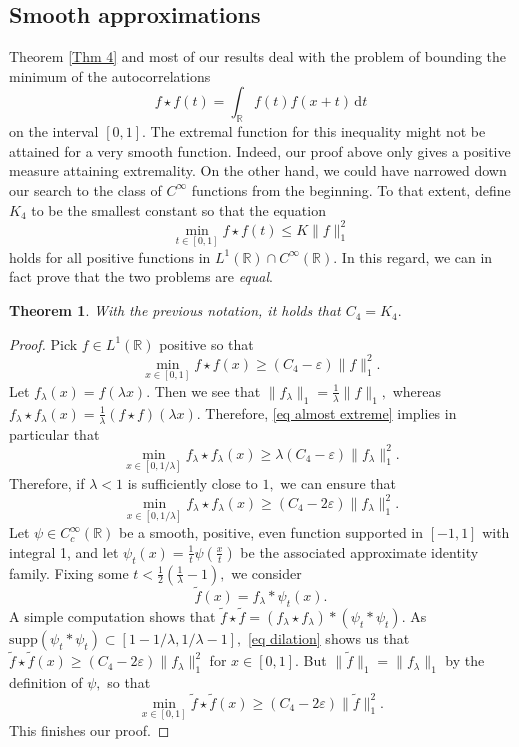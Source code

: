 \documentclass[11pt, reqno]{amsart}
\newcommand{\mmd}{ \mathrm{d}}
\newcommand{\s}{\star}
\numberwithin{equation}{section}
\newtheorem{theorem}{Theorem}[section]
\newcommand{\R}{{\mathbb R}}
\newcommand{\eps}{{\varepsilon}}
\begin{document}
\subsection{Smooth approximations} Theorem \ref{Thm 4} and most of our results deal with the problem of bounding the minimum of the autocorrelations 
\[
f \s f(t) = \int_{\R} f(t) f(x+t) \, \mmd t 
\]
on the interval $[0,1].$ The extremal function for this inequality might not be attained for a very smooth function. Indeed, our proof above only gives a positive measure attaining
extremality. On the other hand, we could have narrowed down our search to the class of $C^{\infty}$ functions from the beginning. 
To that extent, define $K_4$ to be the smallest constant so that the equation  
\begin{equation}\label{eq conv constant} 
\min_{t \in [0,1]} f\s f(t) \le K \|f\|_1^2
\end{equation}
holds for all positive functions in $L^1(\R) \cap C^{\infty}(\R).$ In this regard, we can in fact prove that the two problems are \emph{equal}.

\begin{theorem}\label{Thm last} With the previous notation, it holds that $C_4 = K_4.$
\end{theorem}

\begin{proof} Pick $f \in L^1(\R)$ positive so that 
\begin{equation}\label{eq almost extreme}
\min_{x \in [0,1]} f \s f(x) \ge (C_4 -\eps) \|f\|_1^2.
\end{equation}
Let $f_{\lambda}(x) = f(\lambda x).$ Then we see that $\|f_{\lambda}\|_1 = \frac{1}{\lambda}\|f\|_1,$ whereas 
$f_{\lambda} \s f_{\lambda} (x) = \frac{1}{\lambda} (f\s f)(\lambda x).$ Therefore, \eqref{eq almost extreme} implies in particular that 
\[
\min_{x \in [0,1/\lambda]} f_{\lambda} \s f_{\lambda} (x) \ge \lambda (C_4 - \eps) \|f_{\lambda}\|_1^2.
\]
Therefore, if $\lambda < 1$ is sufficiently close to $1,$ we can ensure that 
\begin{equation}\label{eq dilation}
\min_{x \in [0,1/\lambda]} f_{\lambda} \s f_{\lambda} (x) \ge (C_4 - 2\eps) \|f_{\lambda}\|_1^2.
\end{equation}
Let $\psi \in C^{\infty}_c(\R)$ be a smooth, positive, even function supported in $[-1,1]$ with integral 1, and let $\psi_t(x) = \frac{1}{t} \psi\left(\frac{x}{t}\right)$ be the associated approximate identity 
family. Fixing some $t < \frac{1}{2} \left(\frac{1}{\lambda} - 1\right),$ we consider 
\[
\tilde{f}(x) = f_{\lambda} * \psi_t (x).
\]
A simple computation shows that $\tilde{f} \s \tilde{f} = (f_{\lambda} \s f_{\lambda}) * (\psi_t * \psi_t).$ As $\text{supp}(\psi_t * \psi_t) \subset [1 - 1/\lambda,1/\lambda - 1],$ 
\eqref{eq dilation} shows us that $\tilde{f} \s \tilde{f}(x) \ge (C_4 - 2\eps)\|f_{\lambda}\|_1^2$ for $x \in [0,1].$ But $\|\tilde{f}\|_1 = \|f_{\lambda}\|_1$ by the definition of $\psi,$ so that 
\begin{equation}\label{eq smooth}
\min_{x \in [0,1]} \tilde{f} \s \tilde{f} (x) \ge (C_4 - 2 \eps) \|\tilde{f}\|_1^2.
\end{equation}
This finishes our proof.
\end{proof}
\end{document}
